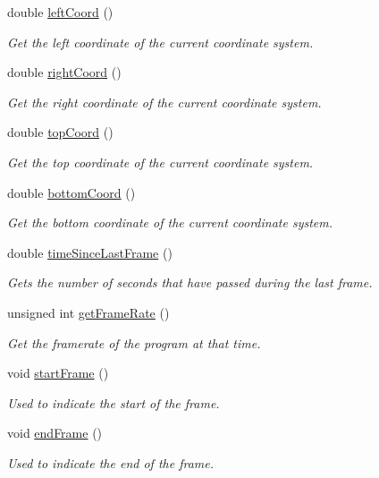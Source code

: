 \begin{CompactItemize}
double \hyperlink{class_window_78ec7a0386c5be0e02fa9489223bc720}{leftCoord} ()
\begin{CompactList}\small\item\em Get the left coordinate of the current coordinate system. \item\end{CompactList}\item 
double \hyperlink{class_window_9f3a34c859cec1cdc6891e95a028266a}{rightCoord} ()
\begin{CompactList}\small\item\em Get the right coordinate of the current coordinate system. \item\end{CompactList}\item 
double \hyperlink{class_window_03ada979fd7c6e076e41c82092931dbc}{topCoord} ()
\begin{CompactList}\small\item\em Get the top coordinate of the current coordinate system. \item\end{CompactList}\item 
double \hyperlink{class_window_cae395291c4864a6eb892a710e5e119d}{bottomCoord} ()
\begin{CompactList}\small\item\em Get the bottom coordinate of the current coordinate system. \item\end{CompactList}\item 
double \hyperlink{class_window_1eb98466f580a9137b4dad6ff85443de}{timeSinceLastFrame} ()
\begin{CompactList}\small\item\em Gets the number of seconds that have passed during the last frame. \item\end{CompactList}\item 
unsigned int \hyperlink{class_window_452c0d55dc623f2092b5fbe60c7b7644}{getFrameRate} ()
\begin{CompactList}\small\item\em Get the framerate of the program at that time. \item\end{CompactList}\item 
void \hyperlink{class_window_b42a6aea2a574f89b62f9d3064aa06cb}{startFrame} ()
\begin{CompactList}\small\item\em Used to indicate the start of the frame. \item\end{CompactList}\item 
void \hyperlink{class_window_592a9d616c06e1dacab0ac261f918865}{endFrame} ()
\begin{CompactList}\small\item\em Used to indicate the end of the frame. \item\end{CompactList}\end{CompactItemize}

